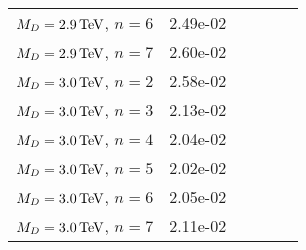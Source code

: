 \begin{table}[hbtp]
\begin{center}
{\begin{tabular}{rrrrrr}
$M_{D} = 2.9 \,\text{Te\hspace{-.08em}V}$, $n=6$  & 2.49e-02 \\
$M_{D} = 2.9 \,\text{Te\hspace{-.08em}V}$, $n=7$  & 2.60e-02 \\
$M_{D} = 3.0 \,\text{Te\hspace{-.08em}V}$, $n=2$  & 2.58e-02 \\
$M_{D} = 3.0 \,\text{Te\hspace{-.08em}V}$, $n=3$  & 2.13e-02 \\
$M_{D} = 3.0 \,\text{Te\hspace{-.08em}V}$, $n=4$  & 2.04e-02 \\
$M_{D} = 3.0 \,\text{Te\hspace{-.08em}V}$, $n=5$  & 2.02e-02 \\
$M_{D} = 3.0 \,\text{Te\hspace{-.08em}V}$, $n=6$  & 2.05e-02 \\
$M_{D} = 3.0 \,\text{Te\hspace{-.08em}V}$, $n=7$  & 2.11e-02 \\\hline
  \end{tabular}
}
  \end{center}
\end{table}
